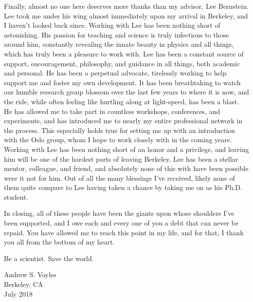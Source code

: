 \documentclass[
]{ucbthesis}
\begin{document}
\begin{frontmatter}
\begin{acknowledgements}
Finally, almost no one here deserves more thanks than my advisor, Lee Bernstein.
Lee took me under his wing almost immediately upon my arrival in Berkeley, and I haven't looked back since.
Working with Lee has been nothing short of astonishing. 
His passion for teaching and science is truly infectious to those around him, constantly revealing the innate beauty in physics and all things,  which has truly been a pleasure to work with.
Lee has been  a constant source of support, encouragement, philosophy, and guidance in all things, both academic and personal.
He has been a perpetual advocate, tirelessly working to help support me and foster my own development.
It has been breathtaking to watch our humble research group blossom over the last few years to where it is now, and the ride, while often feeling  like hurtling along at light-speed, has been a blast.
He has allowed me to take part in countless workshops, conferences, and  experiments, and has introduced me to nearly my entire professional network in the process.
This especially holds true for setting me up with an introduction with the Oslo group, whom I hope to work closely with in the coming years. 
Working with Lee has been nothing short of an honor and a privilege, and leaving him will be one of the hardest parts of leaving Berkeley.
Lee has been a stellar mentor, colleague, and friend, and absolutely none of this with have been possible were it not for him.
Out of all the many blessings I've received, likely none of them  quite compare to Lee having  taken a chance by taking me on as his Ph.D. student.





In closing, all of these people have been the giants upon whose shoulders I've been supported, and I owe each and every one of you a debt that can never be repaid.
You have allowed me to reach this point in my life, and for that, I thank you all from the bottom of my heart.

\vspace{5cm}






Be a scientist. Save the world.

\hspace*{\fill} Andrew S. Voyles\\
\hspace*{\fill} Berkeley, CA\\
\hspace*{\fill} July 2018



\end{acknowledgements}

\end{frontmatter}
\end{document}
